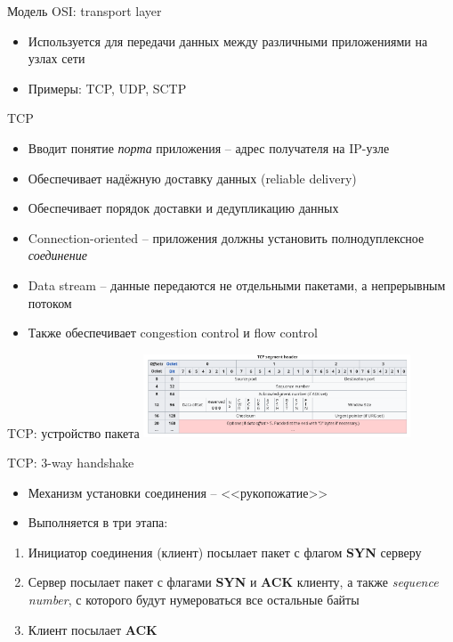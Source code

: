 \documentclass[10pt,pdf,hyperref={unicode}]{beamer}
\begin{document}
\begin{frame}{Модель OSI: transport layer}
\begin{itemize}
    \item Используется для передачи данных между различными приложениями на узлах сети
    \item Примеры: TCP, UDP, SCTP
\end{itemize}
\end{frame}


\begin{frame}{TCP}
\begin{itemize}
    \item Вводит понятие \emph{порта} приложения -- адрес получателя на IP-узле
    \item Обеспечивает надёжную доставку данных (reliable delivery)
    \item Обеспечивает порядок доставки и дедупликацию данных
    \item Connection-oriented -- приложения должны установить полнодуплексное \emph{соединение}
    \item Data stream -- данные передаются не отдельными пакетами, а непрерывным потоком
    \item Также обеспечивает congestion control и flow control
\end{itemize}
\end{frame}

\begin{frame}{TCP: устройство пакета}
\includegraphics[width=300px]{tcp_header.png}
\end{frame}

\begin{frame}{TCP: 3-way handshake}
\begin{itemize}
    \item Механизм установки соединения -- <<рукопожатие>>
    \item Выполняется в три этапа:
\end{itemize}

\begin{enumerate}
    \item Инициатор соединения (клиент) посылает пакет с флагом \textbf{SYN} серверу
    \item Сервер посылает пакет с флагами \textbf{SYN} и \textbf{ACK} клиенту, а также \emph{sequence number}, с которого будут нумероваться все остальные байты
    \item Клиент посылает \textbf{ACK}
\end{enumerate}
\end{frame}
\end{document}
